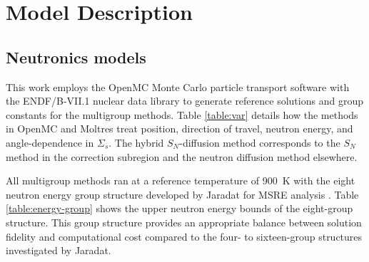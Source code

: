 \section{Model Description}

\subsection{Neutronics models}

This work employs the OpenMC Monte Carlo particle transport software \cite{romano_openmc:_2015}
with the ENDF/B-VII.1 nuclear data library \cite{chadwick_endf/b-vii.1_2011} to generate reference
solutions and group constants for the multigroup methods. Table
\ref{table:var} details how the methods in OpenMC and Moltres treat position, direction
of travel, neutron energy, and angle-dependence in $\Sigma_s$. The hybrid $S_N$-diffusion method
corresponds to the $S_N$ method in the correction subregion and the neutron diffusion method
elsewhere.

All multigroup methods ran at a reference temperature of 900~K with the eight neutron energy group
structure developed by Jaradat for \gls{MSRE} analysis \cite{jaradat_development_2021}.
Table \ref{table:energy-group} shows the upper neutron energy bounds of the eight-group structure.
This group structure provides an appropriate balance between solution fidelity and computational
cost compared to the four- to sixteen-group structures investigated by Jaradat.

